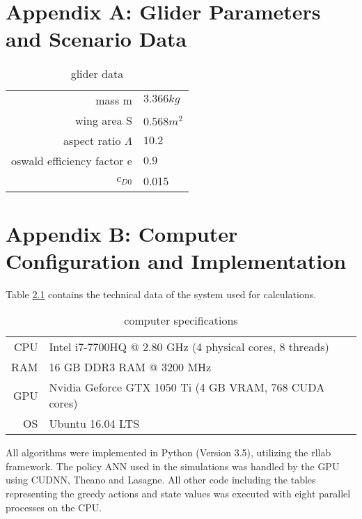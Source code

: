 
\chapter{Appendix A: Glider Parameters and Scenario Data}
\label{appendix_A}

\begin{table}[h]
	\begin{center}
		\begin{tabular}{r|l}
			mass m& $3.366 kg$\\
			wing area S & $0.568 m^2$ \\
			aspect ratio $\Lambda$ & $10.2$ \\
			oswald efficiency factor e& $0.9$ \\
			$c_{D0}$ & 0.015 \\
		\end{tabular}
		\caption{glider data}
		\label{tab:glider_data}
	\end{center}
\end{table}


\chapter{Appendix B: Computer Configuration and Implementation}
\label{appendix_B}
Table \ref{tab:pc_specs} contains the technical data of the system used for calculations.

\begin{table}[h]
	\begin{center}
		\begin{tabular}{r|l}
			CPU & Intel i7-7700HQ @ 2.80 GHz (4 physical cores, 8 threads) \\
			RAM\nomenclature[A]{RAM}{random access memory} & 16 GB DDR3 RAM @ 3200 MHz \\
			GPU & Nvidia Geforce GTX 1050 Ti (4 GB VRAM, 768 CUDA cores) \\
			OS & Ubuntu 16.04 LTS
		\end{tabular}
	\caption{computer specifications}
	\label{tab:pc_specs}
	\end{center}
\end{table}

All algorithms were implemented in Python (Version 3.5), utilizing the rllab framework. The policy ANN used in the simulations was handled by the GPU using CUDNN, Theano and Lasagne. All other code including the tables representing the greedy actions and state values was executed with eight parallel processes on the CPU.

